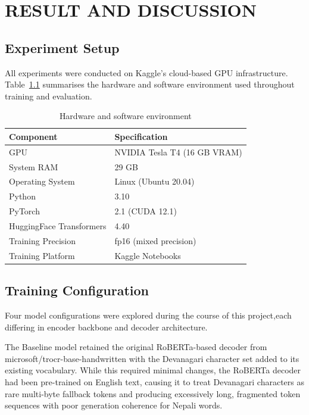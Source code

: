 \chapter{RESULT AND DISCUSSION}


\section{Experiment Setup}
All experiments were conducted on Kaggle's cloud-based GPU infrastructure.
Table~\ref{tab:hardware} summarises the hardware and software environment used
throughout training and evaluation.
 
\begin{table}[h!]
\centering
\renewcommand{\arraystretch}{1.1} 
\begin{tabular}{|l|l|}
\hline
\textbf{Component} & \textbf{Specification} \\ \hline
GPU                      & NVIDIA Tesla T4 (16 GB VRAM) \\ \hline
System RAM               & 29 GB \\ \hline
Operating System         & Linux (Ubuntu 20.04) \\ \hline
Python                   & 3.10 \\ \hline
PyTorch                  & 2.1 (CUDA 12.1) \\ \hline
HuggingFace Transformers & 4.40 \\ \hline
Training Precision       & fp16 (mixed precision) \\ \hline
Training Platform        & Kaggle Notebooks \\ \hline
\end{tabular}
\vspace{2pt} %
\caption{Hardware and software environment}
\label{tab:hardware}
\end{table}

\section{Training Configuration}

Four model configurations were explored during the course of this project,each differing in encoder backbone and decoder architecture.

\noindent The Baseline model retained the original RoBERTa-based decoder from microsoft/trocr-base-handwritten with the Devanagari character set
added to its existing vocabulary. While this required minimal changes, the RoBERTa decoder had been pre-trained on English text, causing it to treat
Devanagari characters as rare multi-byte fallback tokens and producing excessively long, fragmented token sequences with poor generation coherence for Nepali words.

